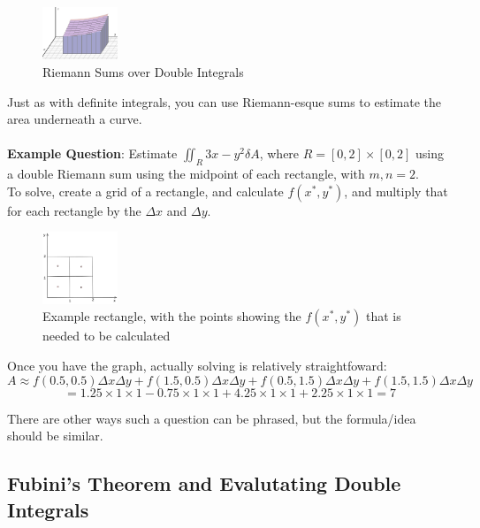 \documentclass{article}
\begin{document}
\begin{figure}[H]
    \centering
    \includegraphics[width=0.2\textwidth]{images/RiemannSumsDoubleIntegralsExample.png}
    \caption{Riemann Sums over Double Integrals}
\end{figure}

Just as with definite integrals, you can use Riemann-esque sums to estimate the area underneath a curve. \\  ~ \\
\textbf{Example Question}: Estimate $\iint_{R} 3x-y^2 \delta A$, where $R = [0,2] \times [0,2]$ using a double Riemann sum using the midpoint  of each rectangle, with $m, n = 2$.\\
To solve, create a grid of a rectangle, and calculate $f(x^*, y^*)$, and multiply that for each rectangle by the $\Delta x$ and $\Delta y$.

\begin{figure}[H]
    \centering
    \includegraphics[width=0.2\textwidth]{images/ExampleRectangle.png}
    \caption{Example rectangle, with the points showing the $f(x^*, y^*)$ that is needed to be calculated}
\end{figure}

Once you have the graph, actually solving is relatively straightfoward: $$A \approx f(0.5, 0.5)  \Delta x  \Delta y + f(1.5, 0.5)  \Delta x  \Delta y + f(0.5, 1.5)  \Delta x  \Delta y + f(1.5, 1.5)  \Delta x  \Delta y $$
$$= 1.25 \times 1 \times 1 -0.75 \times 1 \times 1 + 4.25 \times 1 \times 1 + 2.25 \times 1 \times 1 = \boxed{7}$$

There are other ways such a question can be phrased, but the formula/idea should be similar.


\subsection{Fubini's Theorem and Evalutating Double Integrals}
\end{document}
